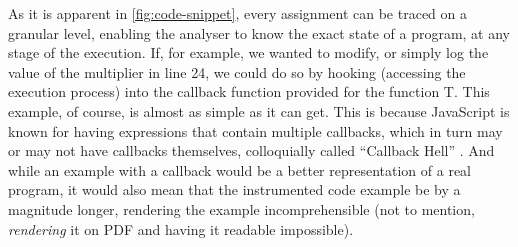 As it is apparent in \autoref{fig:code-snippet}, every assignment can be traced on a granular level, enabling the analyser to know the exact state of a program, at any stage of the execution. 
If, for example, we wanted to modify, or simply log the value of the multiplier in line 24, we could do so by hooking (accessing the execution process) into the callback function provided for the function T.
This example, of course, is almost as simple as it can get. This is because JavaScript is known for having expressions that contain multiple callbacks, which in turn may or may not have callbacks themselves, colloquially called “Callback Hell” \cite{max_ogden_callback_2019}. And while an example with a callback would be a better representation of a real program, it would also mean that the instrumented code example be by a magnitude longer, rendering the example incomprehensible (not to mention, \textit{rendering} it on PDF and having it readable impossible). \\


